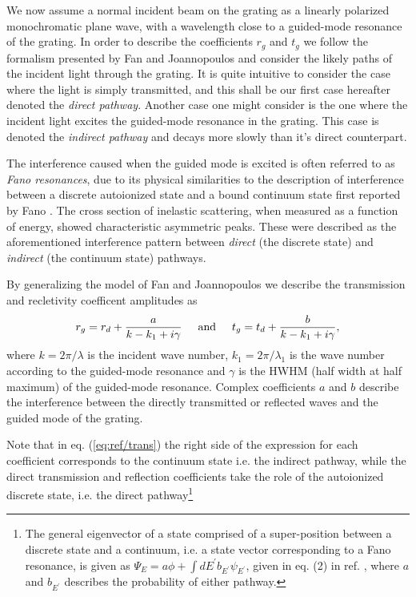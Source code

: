 We now assume a normal incident beam on the grating as a linearly polarized monochromatic plane wave, with a wavelength close to a guided-mode resonance of the grating. In order to describe the coefficients $r_g$ and $t_g$ we follow the formalism presented by Fan and Joannopoulos \cite{Fan-Joannopoulos-guided-mode-resonance} and consider the likely paths of the incident light through the grating. It is quite intuitive to consider the case where the light is simply transmitted, and this shall be our first case hereafter denoted the \emph{direct pathway}. Another case one might consider is the one where the incident light excites the guided-mode resonance in the grating. This case is denoted the \emph{indirect pathway} and decays more slowly than it's direct counterpart. 

The interference caused when the guided mode is excited is often referred to as \emph{Fano resonances}, due to its physical similarities to the description of interference between a discrete autoionized state and a bound continuum state first reported by Fano \cite{Fano-theory}. The cross section of inelastic scattering, when measured as a function of energy, showed characteristic asymmetric peaks. These were described as the aforementioned interference pattern between \emph{direct} (the discrete state) and \emph{indirect} (the continuum state) pathways. 

By generalizing the model of Fan and Joannopoulos \cite{Fan-Joannopoulos-guided-mode-resonance} we describe the transmission and recletivity coefficent amplitudes as 
\begin{equation}
    r_g = r_d + \frac{a}{k-k_1 + i\gamma} \hspace{0.5cm} \text{and} \hspace{0.5cm} t_g = t_d + \frac{b}{k-k_1+i\gamma},
    \label{eq:ref/trans}
\end{equation}
where $k=2\pi/\lambda$ is the incident wave number, $k_1 = 2\pi/\lambda_1$ is the wave number according to the guided-mode resonance and $\gamma$ is the HWHM (half width at half maximum) of the guided-mode resonance. Complex coefficients $a$ and $b$ describe the interference between the directly transmitted or reflected waves and the guided mode of the grating. 

Note that in eq. (\ref{eq:ref/trans}) the right side of the expression for each coefficient corresponds to the continuum state i.e. the indirect pathway, while the direct transmission and reflection coefficients take the role of the autoionized discrete state, i.e. the direct pathway\footnote{The general eigenvector of a state comprised of a super-position between a discrete state and a continuum, i.e. a state vector corresponding to a Fano resonance, is given as $\Psi_E = a\phi + \int dE^{\prime} b_{E^{\prime}} \psi_{E^{\prime}}$, given in eq. (2) in ref. \cite{Fano-theory}, where $a$ and $b_{E^{\prime}}$ describes the probability of either pathway.} \cite{Fano-theory}

